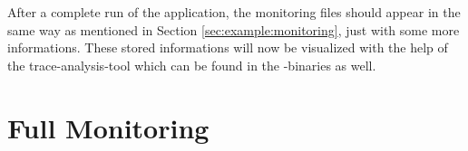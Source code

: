 \setBashListing



After a complete run of the application, the monitoring files should appear in the same way as mentioned in Section \ref{sec:example:monitoring}, just with some more informations. These stored informations will now be visualized with the help of the trace-analysis-tool which can be found in the \Kieker{}-binaries as well.

\section{Full Monitoring}\label{sec:aspectJ:fullweaving}
